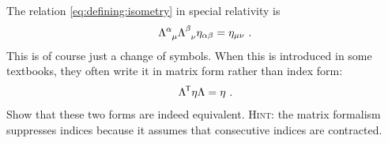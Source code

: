 \documentclass[12pt, oneside]{report}    %
\begin{document}
\begin{exercise}
\label{ex:lorentz:definition:indices}
The relation \eqref{eq:defining:isometry} in special relativity is
\begin{align}
    \Lambda\aij{\alpha}{\mu} \Lambda\aij{\beta}{\nu} \eta_{\alpha\beta} = \eta_{\mu\nu} \ .
\end{align}
This is of course just a change of symbols. When this is introduced in some textbooks, they often write it in matrix form rather than index form:
\begin{align}
    \Lambda^{\mkern-1.5mu\mathsf{T}} \eta \Lambda = \eta \ .
\end{align}
Show that these two forms are indeed equivalent. \textsc{Hint}: the matrix formalism suppresses indices because it assumes that consecutive indices are contracted. 
\end{exercise}
% 
\end{document}
